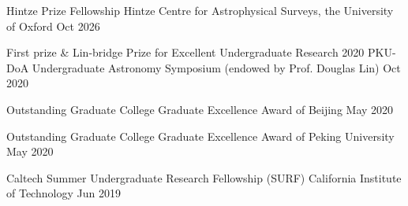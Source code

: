 




\begin{cvhonors}

\cvhonor
{Hintze Prize Fellowship} %
{Hintze Centre for Astrophysical Surveys, the University of Oxford} %
{Oct 2026} %

\cvhonor
{First prize \& Lin-bridge Prize for Excellent Undergraduate Research} %
{2020 PKU-DoA Undergraduate Astronomy Symposium (endowed by Prof. Douglas Lin)} %
{Oct 2020} %

\cvhonor
{Outstanding Graduate} %
{College Graduate Excellence Award of Beijing} %
{May 2020} %

\cvhonor
{Outstanding Graduate} %
{College Graduate Excellence Award of Peking University} %
{May 2020} %





\cvhonor
{Caltech Summer Undergraduate Research Fellowship (SURF)} %
{California Institute of Technology} %
{Jun 2019} %




\end{cvhonors}
